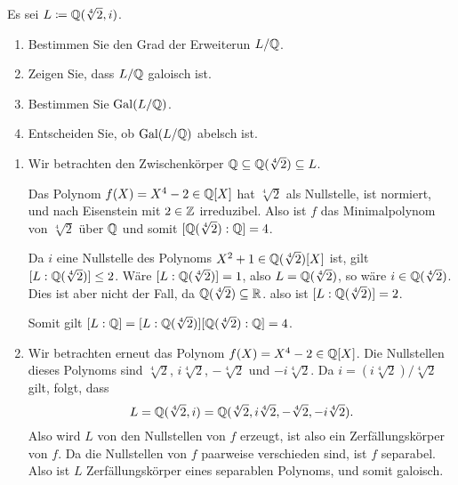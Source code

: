 \begin{question}
  Es sei $L \coloneqq \mathbb{Q}(\sqrt[4]{2}, i)$.
  \begin{enumerate}
    \item
      Bestimmen Sie den Grad der Erweiterun $L/\mathbb{Q}$.
    \item
      Zeigen Sie, dass $L/\mathbb{Q}$ galoisch ist.
    \item
      Bestimmen Sie $\operatorname{Gal}(L / \mathbb{Q})$.
    \item
      Entscheiden Sie, ob $\operatorname{Gal}(L / \mathbb{Q})$ abelsch ist.
  \end{enumerate}
\end{question}


\begin{solution}
  \begin{enumerate}
    \item
      Wir betrachten den Zwischenkörper $\mathbb{Q} \subseteq \mathbb{Q}(\sqrt[4]{2}) \subseteq L$.
      
      Das Polynom $f(X) = X^4 - 2 \in \mathbb{Q}[X]$ hat $\sqrt[4]{2}$ als Nullstelle, ist normiert, und nach Eisenstein mit $2 \in \mathbb{Z}$ irreduzibel.
      Also ist $f$ das Minimalpolynom von $\sqrt[4]{2}$ über $\mathbb{Q}$ und somit $[\mathbb{Q}(\sqrt[4]{2}) : \mathbb{Q}] = 4$.
      
      Da $i$ eine Nullstelle des Polynoms $X^2 + 1 \in \mathbb{Q}(\sqrt[4]{2})[X]$ ist, gilt $[L : \mathbb{Q}(\sqrt[4]{2})] \leq 2$.
      Wäre $[L : \mathbb{Q}(\sqrt[4]{2})] = 1$, also $L = \mathbb{Q}(\sqrt[4]{2})$, so wäre $i \in \mathbb{Q}(\sqrt[4]{2})$.
      Dies ist aber nicht der Fall, da $\mathbb{Q}(\sqrt[4]{2}) \subseteq \mathbb{R}$.
      also ist $[L : \mathbb{Q}(\sqrt[4]{2})] = 2$.
      
      Somit gilt $[L : \mathbb{Q}] = [L : \mathbb{Q}(\sqrt[4]{2})] [\mathbb{Q}(\sqrt[4]{2}) : \mathbb{Q}] = 4$.
      
    \item
      Wir betrachten erneut das Polynom $f(X) = X^4 - 2 \in \mathbb{Q}[X]$.
      Die Nullstellen dieses Polynoms sind $\sqrt[4]{2}$, $i\sqrt[4]{2}$, $-\sqrt[4]{2}$ und $-i\sqrt[4]{2}$.
      Da $i = (i\sqrt[4]{2})/\sqrt[4]{2}$ gilt, folgt, dass
      \[
          L
        = \mathbb{Q}(\sqrt[4]{2}, i)
        = \mathbb{Q}(\sqrt[4]{2}, i\sqrt[4]{2}, -\sqrt[4]{2}, -i\sqrt[4]{2}).
      \]
      Also wird $L$ von den Nullstellen von $f$ erzeugt, ist also ein Zerfällungskörper von $f$.
      Da die Nullstellen von $f$ paarweise verschieden sind, ist $f$ separabel.
      Also ist $L$ Zerfällungskörper eines separablen Polynoms, und somit galoisch.
    

\end{enumerate}
\end{solution}
